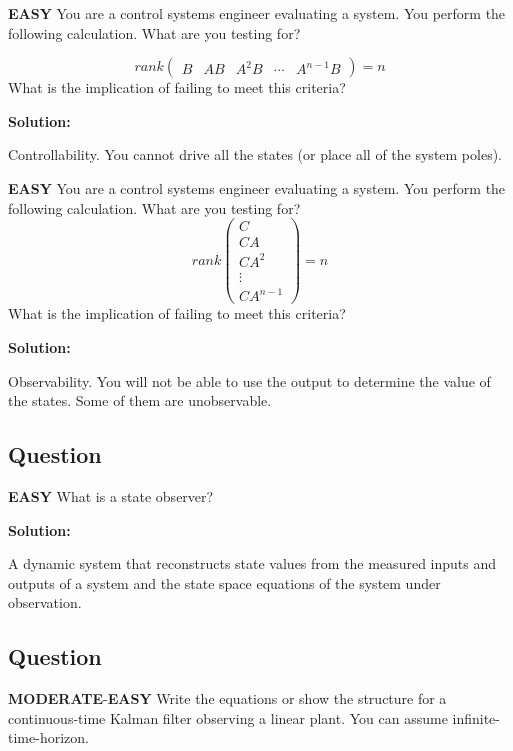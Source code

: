 \documentclass{article}
\newenvironment{Solution}{
\begin{tcolorbox}
\color{purple}
\textbf{Solution:}
}
{
\end{tcolorbox}
\ignorespacesafterend
}
\newcommand{\RatingBase}[2]{\textcolor{#1}{{\fontfamily{phv}\selectfont\textbf{#2}}}}
\newcommand{\Easy}{\RatingBase{green!50!black!50}{EASY}}
\newcommand{\Moderate}{\RatingBase{yellow!50!black!50}{MODERATE}}
\begin{document}
\Easy{} You are a control systems engineer evaluating a system.  You perform the following calculation.  What are you testing for?

\begin{equation}
rank \left(
\begin{matrix}
B  &  AB &  A^2B & \cdots  & A^{n-1}B 
\end{matrix}
\right )  = n
\end{equation}
What is the implication of failing to meet this criteria?

\begin{Solution}
Controllability.  You cannot drive all the states (or place all of the system poles). 
\end{Solution}


\Easy{} You are a control systems engineer evaluating a system.  You perform the following calculation.  What are you testing for?
\begin{equation}
rank \left (
\begin{matrix}
C\\ C A\\  C A^2\\ \vdots \\C A^{n-1}
\end{matrix}
\right )= n
\end{equation}
What is the implication of failing to meet this criteria?

\begin{Solution}
Observability.  You will not be able to use the output to determine the value of the states.  Some of them are unobservable.
\end{Solution}


\subsection{Question}
\Easy{} What is a state observer?

\begin{Solution}
A dynamic system that reconstructs  state values from the measured inputs and outputs of a system and the state space equations of the system under observation.
\end{Solution}
\subsection{Question}
\Moderate{}-\Easy{} Write the equations or show the structure for a continuous-time Kalman filter observing a linear plant.  You can assume infinite-time-horizon.
\end{document}
